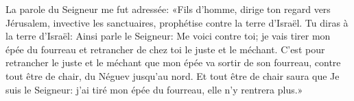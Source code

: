 La parole du Seigneur me fut adressée:
	«Fils d’homme, dirige ton regard vers Jérusalem,
	invective les sanctuaires, prophétise contre la terre d’Israël.
Tu diras à la terre d’Israël: Ainsi parle le Seigneur:
	Me voici contre toi;
	je vais tirer mon épée du fourreau et retrancher de chez toi le juste et le méchant.
C’est pour retrancher le juste et le méchant que mon épée va sortir de son fourreau,
	contre tout être de chair, du Néguev jusqu’au nord.
Et tout être de chair saura que Je suis le Seigneur:
	j’ai tiré mon épée du fourreau, elle n’y rentrera plus.»
